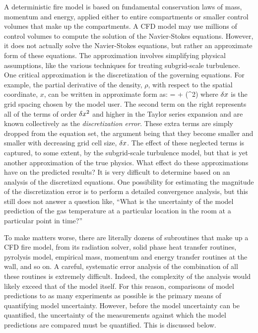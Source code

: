 A deterministic fire model is based on fundamental conservation laws of mass, momentum and energy, applied either to entire compartments or smaller control
volumes that make up the compartments. A CFD model may use millions of control volumes to compute the solution of the Navier-Stokes equations.
However, it does not actually solve the Navier-Stokes equations, but rather an approximate form of these equations. The approximation involves simplifying
physical assumptions, like the various techniques for treating subgrid-scale turbulence.
One critical approximation is the discretization of the governing equations. For example, the partial derivative of the density, $\rho$,
with respect to the spatial coordinate, $x$, can be written in approximate form as:
\be {} =  + (\dx^2) \ee
where $\delta x$ is the grid spacing chosen by the model user.
The second term on the right represents all of the terms of order $\delta x^2$ and higher in the Taylor series expansion and are known collectively as the
{\em discretization error}. These extra terms are simply dropped from
the equation set, the argument being that they become smaller and smaller with decreasing grid cell size, $\delta x$. The effect of these neglected terms is captured, to
some extent, by the subgrid-scale turbulence model, but that is yet another approximation of the true physics. What effect do these approximations have on
the predicted results? It is very difficult to determine based on an analysis of the discretized equations. One possibility for estimating
the magnitude of the discretization error is to perform a detailed
convergence analysis, but this still does not answer a
question like, ``What is the uncertainty of the model prediction of the gas
temperature at a particular location in the room at a particular point in time?''

To make matters worse, there are literally dozens of subroutines that make up a CFD fire model, from its radiation solver, solid phase heat transfer routines, pyrolysis model,
empirical mass, momentum and energy transfer routines at the wall, and so on. A careful, systematic error analysis of the combination of all these routines is
extremely difficult. Indeed, the complexity of the analysis would likely exceed that of the model itself. For this reason, comparisons of model predictions to as many
experiments as possible is the primary means of quantifying model uncertainty. However, before the model uncertainty can be quantified, the uncertainty of the
measurements against which the model predictions are compared must be quantified. This is discussed below.


